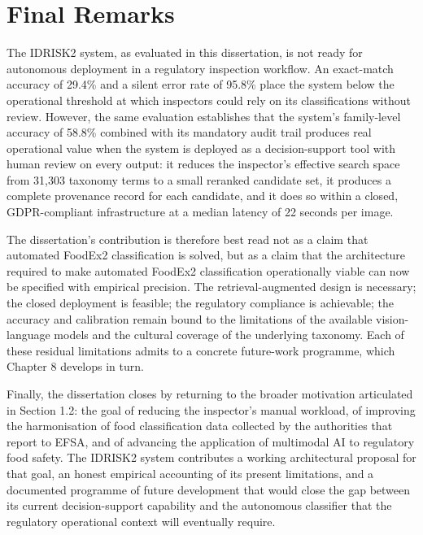 \hypertarget{final-remarks}{%
\section{Final Remarks}\label{final-remarks}}

The IDRISK2 system, as evaluated in this dissertation, is not ready for autonomous deployment in a regulatory inspection workflow. An exact-match accuracy of 29.4\% and a silent error rate of 95.8\% place the system below the operational threshold at which inspectors could rely on its classifications without review. However, the same evaluation establishes that the system's family-level accuracy of 58.8\% combined with its mandatory audit trail produces real operational value when the system is deployed as a decision-support tool with human review on every output: it reduces the inspector's effective search space from 31,303 taxonomy terms to a small reranked candidate set, it produces a complete provenance record for each candidate, and it does so within a closed, GDPR-compliant infrastructure at a median latency of 22 seconds per image.

The dissertation's contribution is therefore best read not as a claim that automated FoodEx2 classification is solved, but as a claim that the architecture required to make automated FoodEx2 classification operationally viable can now be specified with empirical precision. The retrieval-augmented design is necessary; the closed deployment is feasible; the regulatory compliance is achievable; the accuracy and calibration remain bound to the limitations of the available vision-language models and the cultural coverage of the underlying taxonomy. Each of these residual limitations admits to a concrete future-work programme, which Chapter 8 develops in turn.

Finally, the dissertation closes by returning to the broader motivation articulated in Section 1.2: the goal of reducing the inspector's manual workload, of improving the harmonisation of food classification data collected by the authorities that report to EFSA, and of advancing the application of multimodal AI to regulatory food safety. The IDRISK2 system contributes a working architectural proposal for that goal, an honest empirical accounting of its present limitations, and a documented programme of future development that would close the gap between its current decision-support capability and the autonomous classifier that the regulatory operational context will eventually require.
